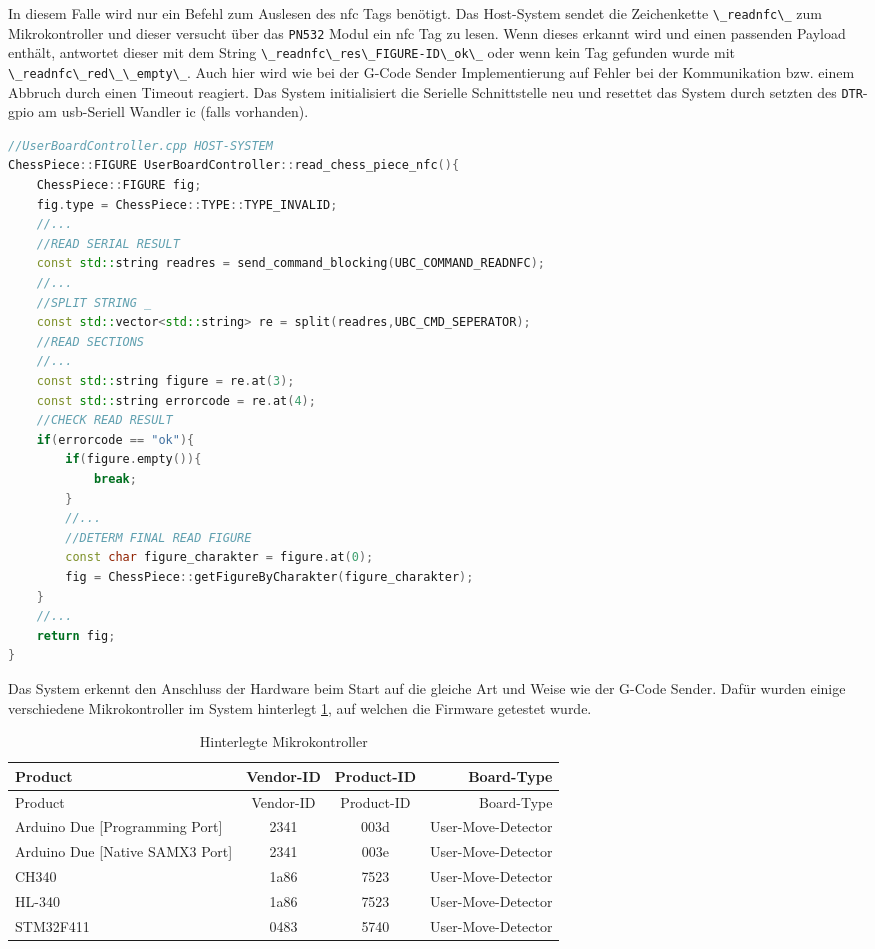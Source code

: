 In diesem Falle wird nur ein Befehl zum Auslesen des \gls{nfc} Tags
benötigt. Das Host-System sendet die Zeichenkette
\passthrough{\lstinline!\_readnfc\_!} zum Mikrokontroller und dieser
versucht über das \passthrough{\lstinline!PN532!} Modul ein \gls{nfc}
Tag zu lesen. Wenn dieses erkannt wird und einen passenden Payload
enthält, antwortet dieser mit dem String
\passthrough{\lstinline!\_readnfc\_res\_FIGURE-ID\_ok\_!} oder wenn kein
Tag gefunden wurde mit
\passthrough{\lstinline!\_readnfc\_red\_\_empty\_!}. Auch hier wird wie
bei der G-Code Sender Implementierung auf Fehler bei der Kommunikation
bzw. einem Abbruch durch einen Timeout reagiert. Das System
initialisiert die Serielle Schnittstelle neu und resettet das System
durch setzten des \passthrough{\lstinline!DTR!}-\gls{gpio} am
\gls{usb}-Seriell Wandler \gls{ic} (falls vorhanden).

\begin{lstlisting}[language={C++}]
//UserBoardController.cpp HOST-SYSTEM
ChessPiece::FIGURE UserBoardController::read_chess_piece_nfc(){
    ChessPiece::FIGURE fig;
    fig.type = ChessPiece::TYPE::TYPE_INVALID;
    //...
    //READ SERIAL RESULT
    const std::string readres = send_command_blocking(UBC_COMMAND_READNFC);
    //...
    //SPLIT STRING _
    const std::vector<std::string> re = split(readres,UBC_CMD_SEPERATOR);
    //READ SECTIONS
    //...
    const std::string figure = re.at(3);
    const std::string errorcode = re.at(4);
    //CHECK READ RESULT
    if(errorcode == "ok"){
        if(figure.empty()){
            break;
        }
        //...
        //DETERM FINAL READ FIGURE
        const char figure_charakter = figure.at(0);
        fig = ChessPiece::getFigureByCharakter(figure_charakter);
    }
    //...
    return fig;
}
\end{lstlisting}

Das System erkennt den Anschluss der Hardware beim Start auf die gleiche
Art und Weise wie der G-Code Sender. Dafür wurden einige verschiedene
Mikrokontroller im System hinterlegt \ref{umbdctl}, auf welchen die
Firmware getestet wurde.

\begin{longtable}[]{@{}lccr@{}}
\caption{Hinterlegte Mikrokontroller \label{umbdctl}}\tabularnewline
\toprule
Product & Vendor-ID & Product-ID & Board-Type\tabularnewline
\midrule
\endfirsthead
\toprule
Product & Vendor-ID & Product-ID & Board-Type\tabularnewline
\midrule
\endhead
Arduino Due {[}Programming Port{]} & 2341 & 003d &
User-Move-Detector\tabularnewline
Arduino Due {[}Native SAMX3 Port{]} & 2341 & 003e &
User-Move-Detector\tabularnewline
CH340 & 1a86 & 7523 & User-Move-Detector\tabularnewline
HL-340 & 1a86 & 7523 & User-Move-Detector\tabularnewline
STM32F411 & 0483 & 5740 & User-Move-Detector\tabularnewline
\bottomrule
\end{longtable}

